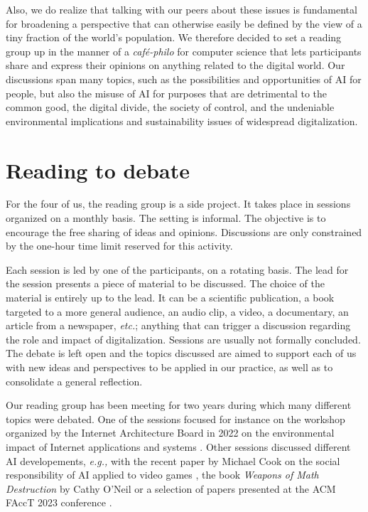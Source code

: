\documentclass[journal]{IEEEtran}
\begin{document}
Also, we do realize that talking with our peers about these issues
is fundamental for broadening a perspective that can otherwise easily be
defined  by  the  view  of   a tiny fraction   of  the  world’s
population. We  therefore decided  to set  a reading  group up  in the
manner of  a \textit{café-philo}  for computer  science that  lets participants
share and  express their  opinions on anything  related to  the digital
world. Our discussions span many topics, such as the possibilities and
opportunities of AI for people, but also the misuse of AI
for purposes that are detrimental to the common good, the digital divide, the
society of control, and the undeniable environmental implications and
sustainability issues of widespread digitalization.

\section{Reading to debate}

For the four of us, the reading group is a side project. It takes place in
sessions organized on a monthly basis. The setting is informal. The objective
is to encourage the free sharing of ideas and opinions. Discussions are
only constrained by the one-hour time limit reserved for this activity.

Each  session  is led  by  one  of  the  participants, on  a  rotating
basis. The  lead for the  session presents a  piece of material  to be
discussed. The choice  of the material is entirely up  to the lead. It
can be  a scientific publication,  a book  targeted to a  more general
audience,  an audio clip, a video,  a documentary,  an  article from  a
newspaper, \textit{etc.}; anything that can  trigger a discussion regarding the
role and impact  of digitalization. Sessions are  usually not formally
concluded. The debate is left open  and the topics discussed are aimed
to support each of us with new ideas and perspectives to be applied in
our practice, as well as to consolidate a general reflection.

Our reading  group has been  meeting for  two years during  which many
different topics  were debated. One  of the sessions focused for instance
on the workshop organized   by  the   Internet Architecture Board in 2022
on the environmental  impact of Internet   applications  and   systems \cite{IAB22}.
Other sessions discussed different AI developements, \textit{e.g.,} with the recent
paper by Michael  Cook on the social responsibility of AI applied to video games \cite{Cook21},
the  book \textit{Weapons  of  Math Destruction} by  Cathy O’Neil  \cite{WMD16} or  a selection  of papers
presented at the ACM FAccT 2023 conference \cite{bell2023_fairness,karan2023_differential_pricing,lucaj2023_ai_regulation,rao2023_facebook_discrimination}.
\end{document}
